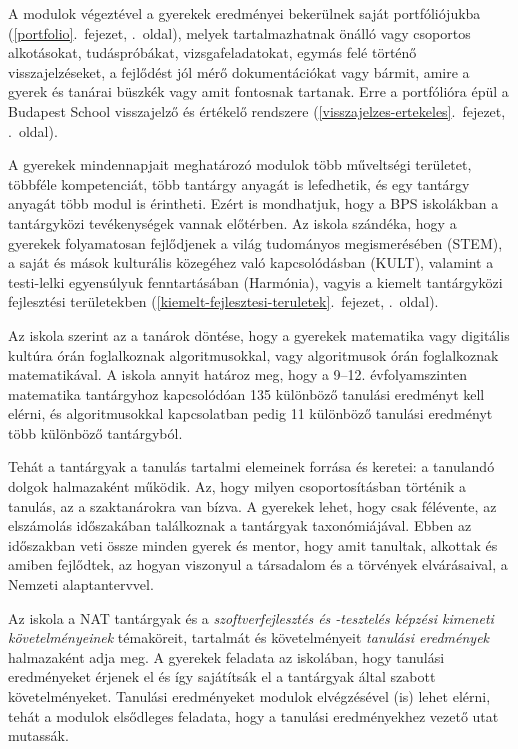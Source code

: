 A modulok végeztével a gyerekek eredményei bekerülnek saját
portfóliójukba (\ref{portfolio}.~fejezet, \pageref{portfolio}.~oldal),
melyek tartalmazhatnak önálló vagy csoportos alkotásokat, tudáspróbákat,
vizsgafeladatokat, egymás felé történő visszajelzéseket, a fejlődést jól
mérő dokumentációkat vagy bármit, amire a gyerek és tanárai büszkék vagy
amit fontosnak tartanak. Erre a portfólióra épül a Budapest School
visszajelző és értékelő rendszere (\ref{visszajelzes-ertekeles}.~fejezet, \pageref{visszajelzes-ertekeles}.~oldal).

A gyerekek mindennapjait meghatározó modulok több műveltségi területet,
többféle kompetenciát, több tantárgy anyagát is lefedhetik, és egy
tantárgy anyagát több modul is érintheti. Ezért is mondhatjuk, hogy a
BPS iskolákban a tantárgyközi tevékenységek vannak előtérben. Az iskola
szándéka, hogy a gyerekek folyamatosan fejlődjenek a világ tudományos
megismerésében (STEM), a saját és mások kulturális közegéhez való
kapcsolódásban (KULT), valamint a testi-lelki egyensúlyuk fenntartásában
(Harmónia), vagyis a
kiemelt tantárgyközi fejlesztési területekben (\ref{kiemelt-fejlesztesi-teruletek}.~fejezet, \pageref{kiemelt-fejlesztesi-teruletek}.~oldal).

Az iskola szerint az a tanárok döntése, hogy a gyerekek matematika vagy
digitális kultúra órán foglalkoznak algoritmusokkal, vagy algoritmusok
órán foglalkoznak matematikával. A iskola annyit határoz meg, hogy a
9--12. évfolyamszinten matematika tantárgyhoz kapcsolódóan 135 különböző
tanulási eredményt kell elérni, és algoritmusokkal kapcsolatban pedig 11
különböző tanulási eredményt több különböző tantárgyból.

Tehát a tantárgyak a tanulás tartalmi elemeinek forrása és keretei: a
tanulandó dolgok halmazaként működik. Az, hogy milyen csoportosításban
történik a tanulás, az a szaktanárokra van bízva. A gyerekek lehet, hogy
csak félévente, az elszámolás időszakában találkoznak a tantárgyak
taxonómiájával. Ebben az időszakban veti össze minden gyerek és mentor,
hogy amit tanultak, alkottak és amiben fejlődtek, az hogyan viszonyul a
társadalom és a törvények elvárásaival, a Nemzeti alaptantervvel.

Az iskola a NAT tantárgyak és a \emph{szoftverfejlesztés és -tesztelés
képzési kimeneti követelményeinek} témaköreit, tartalmát és
követelményeit \emph{tanulási eredmények} halmazaként adja meg. A
gyerekek feladata az iskolában, hogy tanulási eredményeket érjenek el és
így sajátítsák el a tantárgyak által szabott követelményeket. Tanulási
eredményeket modulok elvégzésével (is) lehet elérni, tehát a modulok
elsődleges feladata, hogy a tanulási eredményekhez vezető utat mutassák.

